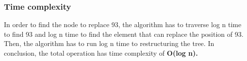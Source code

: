 \subsubsection{Time complexity}
In order to find the node to replace 93, the algorithm has to traverse log n time to find 93 and log n time to find the element that can replace the position of 93. Then, the algorithm has to run log n time to restructuring the tree. In conclusion, the total operation has time complexity of \textbf{O(log n).}















